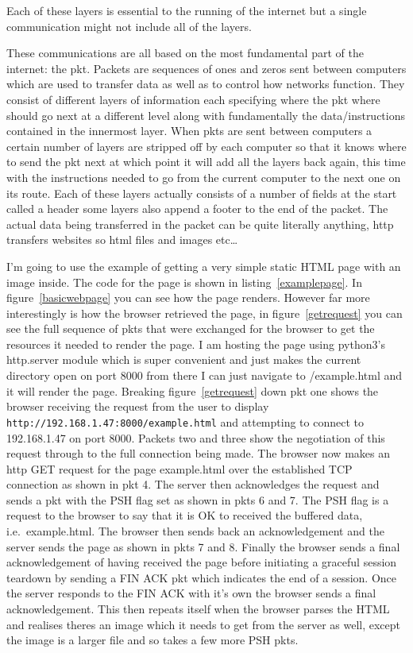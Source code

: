 \documentclass[titlepage]{article}
\begin{document}
Each of these layers is essential to the running of the internet but a single communication
might not include all of the layers.

These communications are all based on the most fundamental part of the internet: the \gls{pkt}.
Packets are sequences of ones and zeros sent between computers which are used to transfer
data as well as to control how networks function. They consist of different layers of 
information each specifying where the \gls{pkt} where should go next at a different level
along with fundamentally the data/instructions contained in the innermost layer. When \glspl{pkt}
are sent between computers a certain number of layers are stripped off by each computer so
that it knows where to send the \gls{pkt} next at which point it will add all the layers back
again, this time with the instructions needed to go from the current computer to the next
one on its route. Each of these layers actually consists of a number of fields at the start
called a \gls{header} some layers also append a footer to the end of the packet. The actual
data being transferred in the packet can be quite literally anything, \gls{http} transfers
websites so \gls{html} files and images etc\ldots

I'm going to use the example of getting a very
simple static HTML page with an image inside. The code for the page is shown in
listing~\ref{examplepage}. In figure~\ref{basicwebpage} you can see how the page renders.
However far more interestingly is how the browser retrieved the page, in figure~\ref{getrequest}
you can see the full sequence of \glspl{pkt} that were exchanged for the browser to get the resources
it needed to render the page. I am hosting the page using python3's http.server module
which is super convenient and just makes the current directory open on port 8000
from there I can just navigate to /example.html and it will render the page. Breaking
figure~\ref{getrequest} down \gls{pkt} one shows the browser receiving the request from
the user to display \verb|http://192.168.1.47:8000/example.html| and attempting to connect
to 192.168.1.47 on port 8000. Packets two and three show the negotiation of this request
through to the full connection being made. The browser now makes an \gls{http} GET
request for the page example.html over the established TCP connection as shown in \gls{pkt} 4.
The server then acknowledges the request and sends a \gls{pkt} with the PSH flag set
as shown in \glspl{pkt} 6 and 7. The PSH flag is a request to the browser to say that it is
OK to received the buffered data, i.e.\ example.html. The browser then sends back an
acknowledgement and the server sends the page as shown in \glspl{pkt} 7 and 8. Finally
the browser sends a final acknowledgement of having received the page before initiating
a graceful session teardown by sending a FIN ACK \gls{pkt} which indicates the end of a session.
Once the server responds to the FIN ACK with it's own the browser sends a final acknowledgement.
This then repeats itself when the browser parses the HTML and realises theres an image which
it needs to get from the server as well, except the image is a larger file and so takes a few
more PSH \glspl{pkt}.
\end{document}

